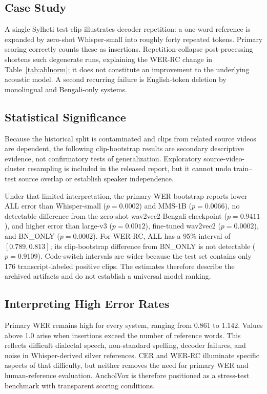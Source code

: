 \documentclass[journal]{IEEEtran}
\begin{document}
\subsection{Case Study}

A single Sylheti test clip illustrates decoder repetition: a one-word reference
is expanded by zero-shot Whisper-small into roughly forty repeated tokens.
Primary scoring correctly counts these as insertions. Repetition-collapse
post-processing shortens such degenerate runs, explaining the WER-RC change in
Table~\ref{tab:ablnorm}; it does not constitute an improvement to the underlying
acoustic model. A second recurring failure is English-token deletion by
monolingual and Bengali-only systems.

\subsection{Statistical Significance}

Because the historical split is contaminated and clips from related source
videos are dependent, the following clip-bootstrap results are secondary
descriptive evidence, not confirmatory tests of generalization. Exploratory
source-video-cluster resampling is included in the released report, but it
cannot undo train--test source overlap or establish speaker independence.

Under that limited interpretation, the primary-WER bootstrap reports lower ALL
error than Whisper-small ($p=0.0002$) and MMS-1B ($p=0.0066$), no detectable
difference from the zero-shot wav2vec2 Bengali checkpoint ($p=0.9411$), and
higher error than large-v3 ($p=0.0012$), fine-tuned wav2vec2 ($p=0.0002$), and
BN\_ONLY ($p=0.0002$). For WER-RC, ALL has a 95\% interval of
$[0.789,0.813]$; its clip-bootstrap difference from BN\_ONLY is not detectable
($p=0.9109$). Code-switch intervals are wider because the test set contains
only 176 transcript-labeled positive clips. The estimates therefore describe
the archived artifacts and do not establish a universal model ranking.


\subsection{Interpreting High Error Rates}

Primary WER remains high for every system, ranging from 0.861 to 1.142. Values
above 1.0 arise when insertions exceed the number of reference words. This
reflects difficult dialectal speech, non-standard spelling, decoder failures,
and noise in Whisper-derived silver references. CER and WER-RC illuminate
specific aspects of that difficulty, but neither removes the need for primary
WER and human-reference evaluation. AncholVox is therefore positioned as a
stress-test benchmark with transparent scoring conditions.
\end{document}

